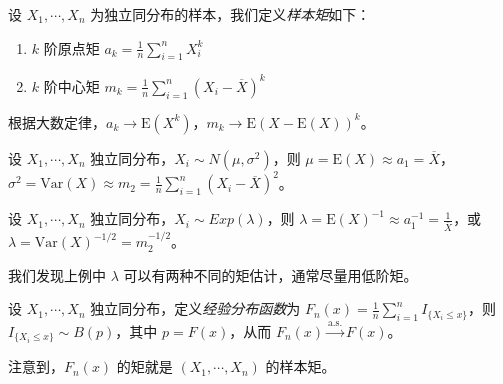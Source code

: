 \documentclass[../main.tex]{subfiles}
\begin{document}
设 $X_1,\cdots,X_n$ 为独立同分布的样本，我们定义\emph{样本矩}如下：
\begin{enumerate}
    \item $k$ 阶原点矩 $a_k=\frac1n\sum_{i=1}^nX_i^k$
    \item $k$ 阶中心矩 $m_k=\frac1n\sum_{i=1}^n(X_i-\overline X)^k$
\end{enumerate}

根据大数定律，$a_k\rightarrow\mathrm E(X^k)$，$m_k\rightarrow\mathrm E(X-\mathrm E(X))^k$。

\begin{example}
    设 $X_1,\cdots,X_n$ 独立同分布，$X_i\sim N(\mu,\sigma^2)$，则 $\mu=\mathrm E(X)\approx a_1=\overline X$，$\sigma^2=\mathrm{Var}(X)\approx m_2=\frac1n\sum_{i=1}^n(X_i-\overline X)^2$。
\end{example}

\begin{example}
    设 $X_1,\cdots,X_n$ 独立同分布，$X_i\sim Exp(\lambda)$，则 $\lambda=\mathrm E(X)^{-1}\approx a_1^{-1}=\frac1{\overline X}$，或 $\lambda=\mathrm{Var}(X)^{-1/2}=m_2^{-1/2}$。
\end{example}

我们发现上例中 $\lambda$ 可以有两种不同的矩估计，通常尽量用低阶矩。

\begin{example}
    设 $X_1,\cdots,X_n$ 独立同分布，定义\emph{经验分布函数}为 $F_n(x)=\frac1n\sum_{i=1}^nI_{\{X_i\leq x\}}$，则 $I_{\{X_i\leq x\}}\sim B(p)$，其中 $p=F(x)$，从而 $F_n(x)\overset{\mathrm{a.s.}}{\rightarrow}F(x)$。
\end{example}

注意到，$F_n(x)$ 的矩就是 $(X_1,\cdots,X_n)$ 的样本矩。
\end{document}
